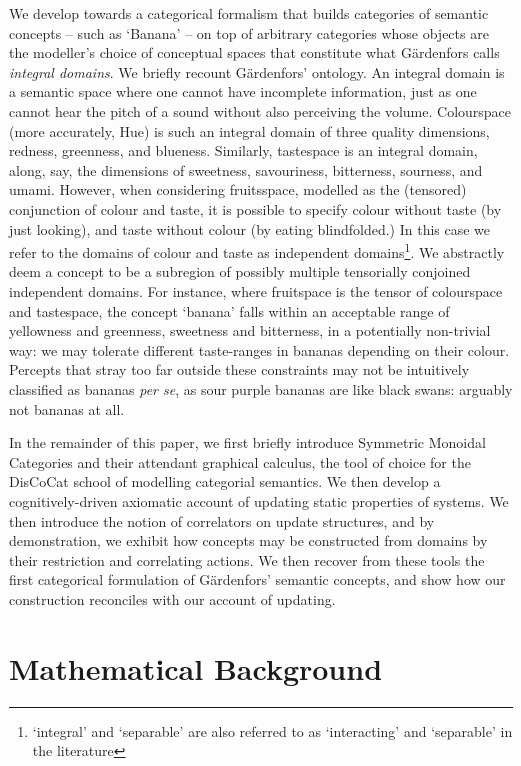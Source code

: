 \documentclass[11pt]{article}
\theoremstyle{definition}
\theoremstyle{plain}
\begin{document}
We develop towards a categorical formalism that builds categories of semantic concepts -- such as `Banana' -- on top of arbitrary categories whose objects are the modeller's choice of conceptual spaces that constitute what G\"{a}rdenfors calls \emph{integral domains}.  We briefly recount G\"{a}rdenfors' ontology. An integral domain is a semantic space where one cannot have incomplete information, just as one cannot hear the pitch of a sound without also perceiving the volume. Colourspace (more accurately, Hue) is such an integral domain of three quality dimensions, redness, greenness, and blueness. Similarly, tastespace is an integral domain, along, say, the dimensions of sweetness, savouriness, bitterness, sourness, and umami. However, when considering fruitsspace, modelled as the (tensored) conjunction of colour and taste, it is possible to specify colour without taste (by just looking), and taste without colour (by eating blindfolded.) In this case we refer to the domains of colour and taste as independent domains\footnote{`integral' and `separable' are also referred to as `interacting' and `separable' in the literature}. We abstractly deem a concept to be a subregion of possibly multiple tensorially conjoined independent domains. For instance, where fruitspace is the tensor of colourspace and tastespace, the concept `banana' falls within an acceptable range of yellowness and greenness, sweetness and bitterness, in a potentially non-trivial way: we may tolerate different taste-ranges in bananas depending on their colour. Percepts that stray too far outside these constraints may not be intuitively classified as bananas \emph{per se}, as sour purple bananas are like black swans: arguably not bananas at all.

In the remainder of this paper, we first briefly introduce Symmetric Monoidal Categories and their attendant graphical calculus, the tool of choice for the DisCoCat school of modelling categorial semantics. We then develop a cognitively-driven axiomatic account of updating static properties of systems. We then introduce the notion of correlators on update structures, and by demonstration, we exhibit how concepts may be constructed from domains by their restriction and correlating actions. We then recover from these tools the first categorical formulation of G\"{a}rdenfors' semantic concepts, and show how our construction reconciles with our account of updating.

\section{Mathematical Background}
\end{document}
